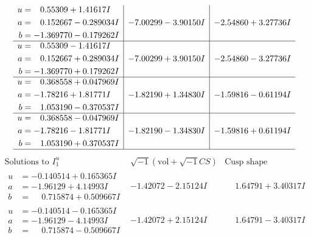\documentclass[1p]{elsarticle_modified}
\theoremstyle{definition}
\newcommand{\I}{\sqrt{-1}}
\begin{document}
$$\begin{array}{c|c|c}
\begin{aligned}
u &= \phantom{-}0.55309 + 1.41617 I \\
a &= \phantom{-}0.152667 - 0.289034 I \\
b &= -1.369770 - 0.179262 I\end{aligned}
 & -7.00299 - 3.90150 I & -2.54860 + 3.27736 I \\ \hline\begin{aligned}
u &= \phantom{-}0.55309 - 1.41617 I \\
a &= \phantom{-}0.152667 + 0.289034 I \\
b &= -1.369770 + 0.179262 I\end{aligned}
 & -7.00299 + 3.90150 I & -2.54860 - 3.27736 I \\ \hline\begin{aligned}
u &= \phantom{-}0.368558 + 0.047969 I \\
a &= -1.78216 + 1.81771 I \\
b &= \phantom{-}1.053190 - 0.370537 I\end{aligned}
 & -1.82190 + 1.34830 I & -1.59816 - 0.61194 I \\ \hline\begin{aligned}
u &= \phantom{-}0.368558 - 0.047969 I \\
a &= -1.78216 - 1.81771 I \\
b &= \phantom{-}1.053190 + 0.370537 I\end{aligned}
 & -1.82190 - 1.34830 I & -1.59816 + 0.61194 I\\
 \hline 
 \end{array}$$\newpage$$\begin{array}{c|c|c}  
\text{Solutions to }I^u_{1}& \I (\text{vol} + \sqrt{-1}CS) & \text{Cusp shape}\\
 \hline 
\begin{aligned}
u &= -0.140514 + 0.165365 I \\
a &= -1.96129 + 4.14993 I \\
b &= \phantom{-}0.715874 + 0.509667 I\end{aligned}
 & -1.42072 - 2.15124 I & \phantom{-}1.64791 + 3.40317 I \\ \hline\begin{aligned}
u &= -0.140514 - 0.165365 I \\
a &= -1.96129 - 4.14993 I \\
b &= \phantom{-}0.715874 - 0.509667 I\end{aligned}
 & -1.42072 + 2.15124 I & \phantom{-}1.64791 - 3.40317 I \\ \hline\begin{aligned}

\end{aligned}
\end{array}$$
\end{document}
